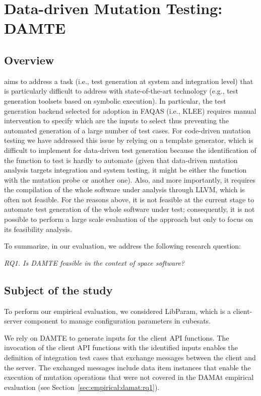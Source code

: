 \clearpage
\section{Data-driven Mutation Testing: DAMTE}
\label{sec:testGeneration:dataDriven}

\subsection{Overview}

\DAMTE aims to address a task (i.e., test generation at system and integration level) that is particularly difficult to address with state-of-the-art technology (e.g., test generation toolsets based on symbolic execution). In particular, the test generation backend selected for adoption in FAQAS (i.e., KLEE) requires manual intervention to specify which are the inputs to select thus preventing the automated generation of a large number of test cases. For code-driven mutation testing we have addressed this issue by relying on a template generator, which is difficult to implement for data-driven test generation because the identification of the function to test is hardly to automate (given that data-driven mutation analysis targets integration and system testing, it might be either the function with the mutation probe or another one). Also, and more importantly, it requires the compilation of the whole software under analysis through LLVM, which is often not feasible. For the reasons above, it is not feasible at the current stage to automate test generation of the whole software under test; consequently,
it is not possible to perform a large scale evaluation of the approach but only to focus on its feasibility analysis.

To summarize, in our evaluation, we address the following research question:

\emph{RQ1. Is DAMTE feasible in the context of space software?}



\subsection{Subject of the study}

To perform our empirical evaluation, we considered LibParam, which is a client-server component to manage configuration parameters in cubesats.

We rely on DAMTE to generate inputs for the \PARAM client API functions. The invocation of the \PARAM client API functions with the identified inputs enables the definition of integration test cases that exchange messages between the \PARAM client and the \PARAM server. The exchanged messages include data item instances that enable the execution of mutation operations that were not covered in the DAMAt empirical evaluation (see Section~\ref{sec:empirical:damat:rq1}).

